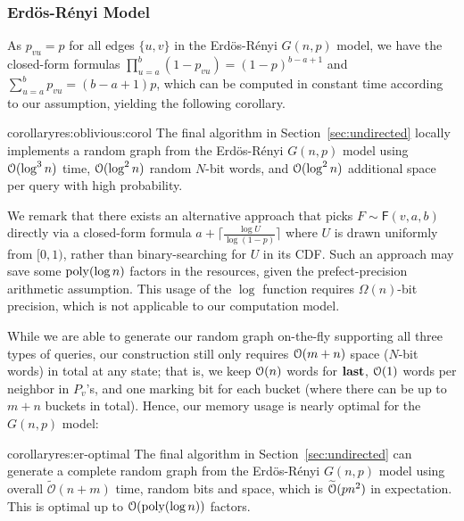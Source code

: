 \subsubsection{Erd\"{o}s-R\'{e}nyi Model}
\label{sec:app_er}
As $p_{vu} = p$ for all edges $\{u,v\}$ in the Erd\"{o}s-R\'{e}nyi $G(n,p)$ model, we have the closed-form formulas $\prod_{u=a}^b (1-p_{vu}) = (1-p)^{b-a+1}$ and $\sum_{u=a}^b p_{vu} = (b-a+1)p$, which can be computed in constant time according to our assumption, yielding the following corollary.
\begin{restatable}{corollary}{res:oblivious:corol}
The final algorithm in Section~\ref{sec:undirected} locally implements a random graph from the Erd\"{o}s-R\'{e}nyi $G(n,p)$ model using $\mathcal{O}(\log^3 n)$ time, $\mathcal{O}(\log^2 n)$ random $N$-bit words, and $\mathcal{O}(\log^2 n)$ additional space per query with high probability.
\end{restatable}

We remark that there exists an alternative approach that picks $F\sim\mathsf{F}(v,a,b)$ directly via a closed-form formula $a+\lceil\frac{\log U}{\log (1-p)}\rceil$ where $U$ is drawn uniformly from $[0,1)$, rather than binary-searching for $U$ in its CDF. Such an approach may save some $\mathrm{poly}(\log n)$ factors in the resources, given the prefect-precision arithmetic assumption. This usage of the $\log$ function requires $\Omega(n)$-bit precision, which is not applicable to our computation model.

While we are able to generate our random graph on-the-fly supporting all three types of queries, our construction still only requires $\mathcal{O}(m+n)$ space ($N$-bit words) in total at any state; that is, we keep $\mathcal{O}(n)$ words for $\mathbf{last}$, $\mathcal{O}(1)$ words per neighbor in $P_v$'s, and one marking bit for each bucket (where there can be up to $m+n$ buckets in total). Hence, our memory usage is nearly optimal for the $G(n,p)$ model:

\begin{restatable}{corollary}{res:er-optimal}
\label{thm:er-optimal}
The final algorithm in Section~\ref{sec:undirected} can generate a complete random graph
from the Erd\"{o}s-R\'{e}nyi $G(n,p)$ model using overall
$\widetilde{\mathcal{O}}(n+m)$ time, random bits and space, which is $\widetilde{\mathcal{O}}(pn^2)$ in expectation.
This is optimal up to $ \mathcal{O}(\mathrm{poly}(\log n))$ factors.
\end{restatable}

\iffalse
The deterministic version (Section~\ref{sec:ER-det}) does not require the extra overhead resulting from failed iterations.
However, the two level data-structure introduces an extra $\Bo(\log n)$ factor, resulting in the same overall running time.
However, this only requires one $N$-bit random word.
\fi





